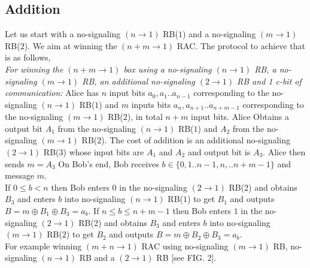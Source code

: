 \subsection*{Addition} 
Let us start with a no-signaling $(n\rightarrow 1)$ RB($1$) and a no-signaling $(m\rightarrow 1)$ RB($2$).
We aim at winning the $(n+m\rightarrow 1)$ RAC. The protocol to achieve that is
as follows, \\
\textit{For winning the $(n+m \rightarrow 1)$ box using a no-signaling $(n\rightarrow 1)$ RB, a no-signaling $(m\rightarrow 1)$ RB, an additional  no-signaling $(2\rightarrow 1)$ RB and 1 c-bit of communication:}
Alice has $n$ input bits $a_{0},a_{1}..a_{n-1}$ corresponding to the
no-signaling $(n\rightarrow 1)$ RB($1$) and $m$ inputs bits  $a_{n},a_{n+1}..a_{n+m-1}$
corresponding to the no-signaling $(m\rightarrow 1)$ RB($2$), in total $n+m$ input bits. Alice Obtains a
output bit $A_{1}$ from the no-signaling $(n\rightarrow 1)$ RB($1$) and $A_{2}$ from the no-signaling $(m\rightarrow 1)$
RB($2$).
The {cost} of addition is an additional no-signaling $(2\rightarrow 1)$ RB($3$) whose
input bits are $A_{1}$ and $A_{2}$ and output bit is $A_{3}$. Alice then sends $m=A_{3}$ 
On Bob's end, Bob receives $b\in\{0,1..n-1,n,..n+m-1\}$ and message
$m$. \\
If $0\leq b<n$ then Bob enters $0$ in the no-signaling $(2\rightarrow 1)$ RB(2) and
obtains $B_{3}$ and enters $b$ into no-signaling $(n\rightarrow 1)$ RB($1$) to get
$B_{1}$ and outputs $B=m\oplus B_{1}\oplus B_{3}=a_{b}$.
If $n\leq b\leq n+m-1$ then Bob enters $1$ in the no-signaling $(2\rightarrow1)$ RB(2)
and obtains $B_{3}$ and enters $b$ into no-signaling $(m\rightarrow 1)$ RB($2$) to
get $B_{2}$ and outputs $B=m\oplus B_{2}\oplus B_{3}=a_{b}$.\\
For example winning $(m+n\rightarrow 1)$ RAC using no-signaling $(m\rightarrow 1)$ RB, no-signaling $(n\rightarrow1)$ RB and
a $(2\rightarrow1)$ RB [see FIG. 2].

